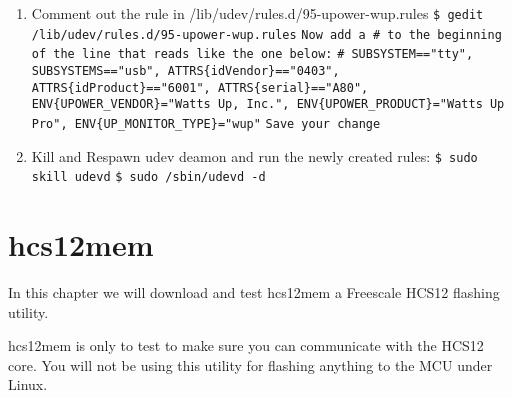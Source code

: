\documentclass[12pt,notitlepage,onecolumn,oneside,openany]{memoir}
\begin{document}
\begin{enumerate}
\item \textsf{Comment out the rule in /lib/udev/rules.d/95-upower-wup.rules} \newline
	  \texttt{\$ gedit /lib/udev/rules.d/95-upower-wup.rules} \newline
      \texttt{Now add a \# to the beginning of the line that reads like the one below:} \newline      
      \texttt{\# SUBSYSTEM=="tty", SUBSYSTEMS=="usb", ATTRS\{idVendor\}=="0403", ATTRS\{idProduct\}=="6001", ATTRS\{serial\}=="A80\?\?\?\?\?", ENV\{UPOWER\_VENDOR\}="Watts Up, Inc.", ENV\{UPOWER\_PRODUCT\}="Watts Up\? Pro", ENV\{UP\_MONITOR\_TYPE\}="wup"} \newline
      \texttt{Save your change} \newline

\item \textsf{Kill and Respawn udev deamon and run the newly created rules:} \newline
      \texttt{\$ sudo skill udevd} \newline
      \texttt{\$ sudo /sbin/udevd -d} \newline

\end{enumerate}

\chapter{\textsf{hcs12mem}}
\textsf{In this chapter we will download and test hcs12mem a Freescale HCS12 flashing utility.} \newline

\textsf{hcs12mem is only to test to make sure you can communicate with the HCS12 core.  You will not be using this utility for flashing anything to the MCU under Linux.} \newline
\end{document}
